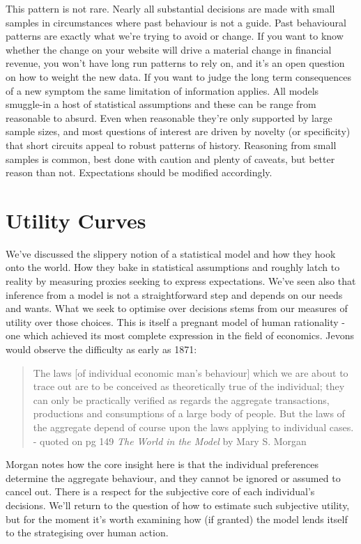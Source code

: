 \documentclass[
]{book}
\theoremstyle{definition}
\theoremstyle{definition}
\theoremstyle{definition}
\theoremstyle{remark}
\begin{document}
This pattern is not rare. Nearly all substantial decisions are made with small samples in circumstances where past behaviour is not a guide. Past behavioural patterns are exactly what we're trying to avoid or change. If you want to know whether the change on your website will drive a material change in financial revenue, you won't have long run patterns to rely on, and it's an open question on how to weight the new data. If you want to judge the long term consequences of a new symptom the same limitation of information applies. All models smuggle-in a host of statistical assumptions and these can be range from reasonable to absurd. Even when reasonable they're only supported by large sample sizes, and most questions of interest are driven by novelty (or specificity) that short circuits appeal to robust patterns of history. Reasoning from small samples is common, best done with caution and plenty of caveats, but better reason than not. Expectations should be modified accordingly.

\hypertarget{utility-curves}{%
\section{Utility Curves}\label{utility-curves}}

We've discussed the slippery notion of a statistical model and how they hook onto the world. How they bake in statistical assumptions and roughly latch to reality by measuring proxies seeking to express expectations. We've seen also that inference from a model is not a straightforward step and depends on our needs and wants. What we seek to optimise over decisions stems from our measures of utility over those choices. This is itself a pregnant model of human rationality - one which achieved its most complete expression in the field of economics. Jevons would observe the difficulty as early as 1871:

\begin{quote}
The laws {[}of individual economic man's behaviour{]} which we are about to trace out are to be conceived as theoretically true of the individual; they can only be practically verified as regards the aggregate transactions, productions and consumptions of a large body of people. But the laws of the aggregate depend of course upon the laws applying to individual cases. - quoted on pg 149 \emph{The World in the Model} by Mary S. Morgan
\end{quote}

Morgan notes how the core insight here is that the individual preferences determine the aggregate behaviour, and they cannot be ignored or assumed to cancel out. There is a respect for the subjective core of each individual's decisions. We'll return to the question of how to estimate such subjective utility, but for the moment it's worth examining how (if granted) the model lends itself to the strategising over human action.
\end{document}
